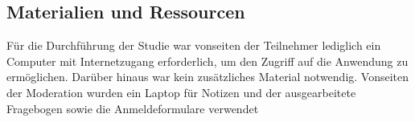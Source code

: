 

\subsection{Materialien und Ressourcen}

Für die Durchführung der Studie war vonseiten der Teilnehmer lediglich ein Computer mit Internetzugang erforderlich, um den Zugriff auf die Anwendung zu ermöglichen. Darüber hinaus war kein zusätzliches Material notwendig.
Vonseiten der Moderation wurden ein Laptop für Notizen und der ausgearbeitete Fragebogen sowie die Anmeldeformulare verwendet

 
 




